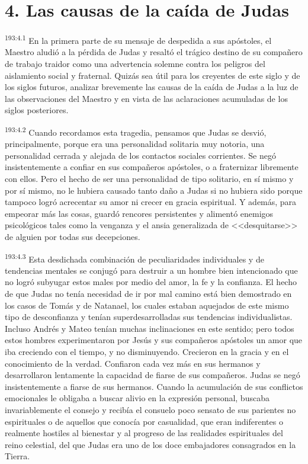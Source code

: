 \section*{4. Las causas de la caída de Judas}
\par 
\textsuperscript{193:4.1} En la primera parte de su mensaje de despedida a sus apóstoles, el Maestro aludió a la pérdida de Judas y resaltó el trágico destino de su compañero de trabajo traidor como una advertencia solemne contra los peligros del aislamiento social y fraternal. Quizás sea útil para los creyentes de este siglo y de los siglos futuros, analizar brevemente las causas de la caída de Judas a la luz de las observaciones del Maestro y en vista de las aclaraciones acumuladas de los siglos posteriores.

\par 
\textsuperscript{193:4.2} Cuando recordamos esta tragedia, pensamos que Judas se desvió, principalmente, porque era una personalidad solitaria muy notoria, una personalidad cerrada y alejada de los contactos sociales corrientes. Se negó insistentemente a confiar en sus compañeros apóstoles, o a fraternizar libremente con ellos. Pero el hecho de ser una personalidad de tipo solitario, en sí mismo y por sí mismo, no le hubiera causado tanto daño a Judas si no hubiera sido porque tampoco logró acrecentar su amor ni crecer en gracia espiritual. Y además, para empeorar más las cosas, guardó rencores persistentes y alimentó enemigos psicológicos tales como la venganza y el ansia generalizada de <<desquitarse>> de alguien por todas sus decepciones.

\par 
\textsuperscript{193:4.3} Esta desdichada combinación de peculiaridades individuales y de tendencias mentales se conjugó para destruir a un hombre bien intencionado que no logró subyugar estos males por medio del amor, la fe y la confianza. El hecho de que Judas no tenía necesidad de ir por mal camino está bien demostrado en los casos de Tomás y de Natanael, los cuales estaban aquejados de este mismo tipo de desconfianza y tenían superdesarrolladas sus tendencias individualistas. Incluso Andrés y Mateo tenían muchas inclinaciones en este sentido; pero todos estos hombres experimentaron por Jesús y sus compañeros apóstoles un amor que iba creciendo con el tiempo, y no disminuyendo. Crecieron en la gracia y en el conocimiento de la verdad. Confiaron cada vez más en sus hermanos y desarrollaron lentamente la capacidad de fiarse de sus compañeros. Judas se negó insistentemente a fiarse de sus hermanos. Cuando la acumulación de sus conflictos emocionales le obligaba a buscar alivio en la expresión personal, buscaba invariablemente el consejo y recibía el consuelo poco sensato de sus parientes no espirituales o de aquellos que conocía por casualidad, que eran indiferentes o realmente hostiles al bienestar y al progreso de las realidades espirituales del reino celestial, del que Judas era uno de los doce embajadores consagrados en la Tierra.

